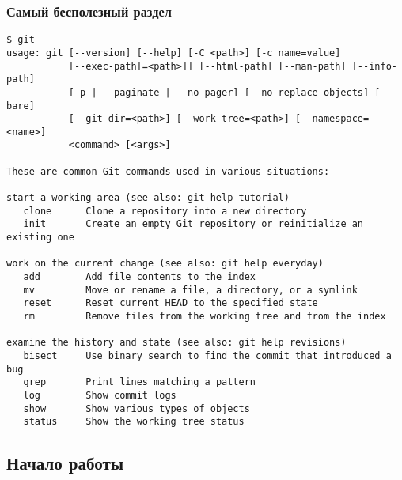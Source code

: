 \documentclass[pdf,russian]{beamer}
\begin{document}
\begin{frame}[fragile]
    \frametitle{Самый бесполезный раздел}
    \pause
    \center
    \onslide<+->
    \begin{Verbatim}[fontsize=\relsize{-3}]
$ git
usage: git [--version] [--help] [-C <path>] [-c name=value]
           [--exec-path[=<path>]] [--html-path] [--man-path] [--info-path]
           [-p | --paginate | --no-pager] [--no-replace-objects] [--bare]
           [--git-dir=<path>] [--work-tree=<path>] [--namespace=<name>]
           <command> [<args>]

These are common Git commands used in various situations:

start a working area (see also: git help tutorial)
   clone      Clone a repository into a new directory
   init       Create an empty Git repository or reinitialize an existing one

work on the current change (see also: git help everyday)
   add        Add file contents to the index
   mv         Move or rename a file, a directory, or a symlink
   reset      Reset current HEAD to the specified state
   rm         Remove files from the working tree and from the index

examine the history and state (see also: git help revisions)
   bisect     Use binary search to find the commit that introduced a bug
   grep       Print lines matching a pattern
   log        Show commit logs
   show       Show various types of objects
   status     Show the working tree status
    \end{Verbatim}
\end{frame}

\subsection{Начало работы}

\end{document}
